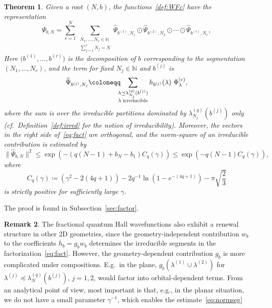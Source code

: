 \documentclass[letterpaper, DIV=17]{scrartcl}
\newtheorem{theorem}{Theorem}[section]  %
\numberwithin{equation}{section}
\theoremstyle{definition}
\newtheorem{rem}[theorem]{Remark}
\begin{document}
\begin{theorem}\label{thm:fact}
Given a root $ (N,b) $, the functions~\eqref{def:WFc} have the representation
\begin{equation}\label{eq:fact}
 \Psi_{b,N}  = \sum_{r=1}^N \sum_{ \substack{N_1, \dots , N_r \in \mathbb{N}\\  \sum_{j=1}^r N_j = N } }  \widehat \Psi_{b^{(1)},N_1} \odot  \widehat \Psi_{b^{(2)},N_2} \odot \cdots \odot  \widehat \Psi_{b^{(r)},N_r} ,
\end{equation}
Here $  \big(b^{(1)} , \dots , b^{(r)} \big)  $ is the decomposition of $ b $ corresponding to the segmentation $ (N_1, \dots , N_r )$, and the term for fixed $ N_j \in \mathbb{N} $ and $ b^{(j)} $ is
\begin{equation}\label{eq:irredexp}
	 \widehat \Psi_{b^{(j)},N_j} \coloneqq \mkern-10mu \sum_{\substack{ \lambda  \preceq \lambda^{(q)}_{N_j}(b^{(j)}) \\ \lambda \; \textrm{irreducible}} } h_{b^{(j)} }(\lambda) \ \Phi^{(c)}_\lambda ,
\end{equation}
where the sum is over the irreducible partitions dominated by $ \lambda^{(q)}_{N_j}(b^{(j)}) $  only  (cf.\ Definition~\ref{def:irred} for the notion of irreducibility). Moreover, the vectors in the right side of~\eqref{eq:fact} are orthogonal, and the norm-square of an irreducible contribution is estimated by 
\begin{equation}\label{eq:normseg}
\big\|  \widehat \Psi_{b,N} \big\|^2 \leq  \exp\left( - \left(q(N-1)+b_N-b_1\right) C_q(\gamma) \right)  \leq \exp\left( - q (N-1) C_q(\gamma) \right) ,
\end{equation}
where 
\begin{equation}\label{def:Cgamma}
C_q(\gamma)  \coloneqq  (\gamma^2 - 2(4q+1)) -2  q^{-1} \ln  (1- e^{-(4q+1)} )  -  \pi \sqrt{\frac{2}{3}}  
\end{equation}
is strictly positive for sufficiently large $ \gamma $.
\end{theorem}
The proof is found in Subsection~\ref{sec:factor}. 
%
\begin{rem}
The fractional quantum Hall wavefunctions also exhibit a renewal structure in other 2D geometries, since the geometry-independent contribution $w_b $ to the coefficients $ h_b = g_b w_b $ determines the irreducible segments in the factorization~\eqref{eq:fact}. However, the geometry-dependent contribution $ g_b $ is more complicated under compositions. E.g.\ in the plane, $ g_b(\lambda^{(1)} \cup \lambda^{(2)} ) $ for $ \lambda^{(j)} \preceq \lambda^{(q)}_N(b^{(j)}) $, $ j = 1,2 $, would factor into orbital-dependent terms.  From an analytical point of view, most important is that, e.g., in the planar situation, we do not have a small parameter $ \gamma^{-1} $, which enables the estimate~\eqref{eq:normseg}
\end{rem}
\end{document}

